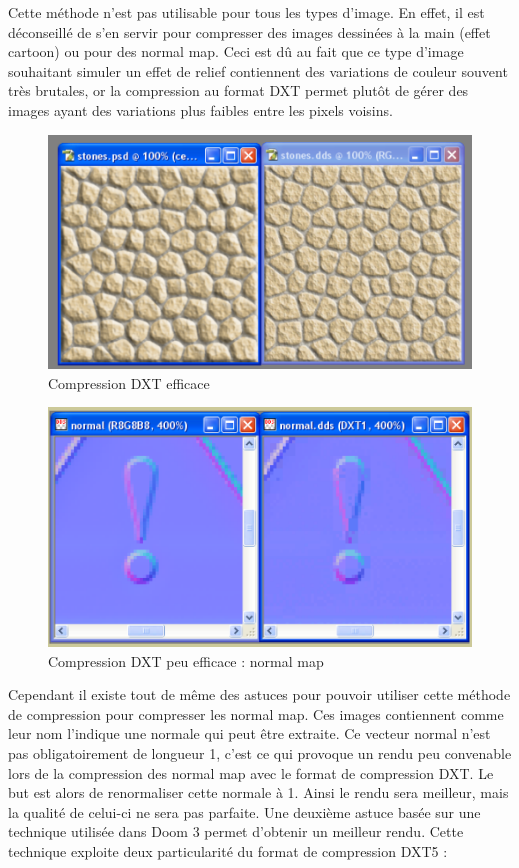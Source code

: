 \documentclass[a4paper, 11pt]{article} %
\begin{document}
Cette méthode n'est pas utilisable pour tous les types d'image. En effet, il est déconseillé de s'en servir pour compresser des images dessinées à la main (effet cartoon) ou pour des normal map. Ceci est dû au fait que ce type d'image souhaitant simuler un effet de relief contiennent des variations de couleur souvent très brutales, or la compression au format DXT permet plutôt de gérer des images ayant des variations plus faibles entre les pixels voisins.


\begin{figure}[!h]%
	\begin{center}
	\includegraphics[width=0.60\columnwidth]{images/dxt_compression_1.png}%
	\caption{Compression DXT efficace}%
	\label{}%
	\end{center}
\end{figure}

\begin{figure}[!h]%
	\begin{center}
	\includegraphics[width=0.60\columnwidth]{images/dxt_compression_2.png}%
	\caption{Compression DXT peu efficace : normal map}%
	\label{}%
	\end{center}
\end{figure}

Cependant il existe tout de même des astuces pour pouvoir utiliser cette méthode de compression pour compresser les normal map. Ces images contiennent comme leur nom l'indique une normale qui peut être extraite. Ce vecteur normal n'est pas obligatoirement de longueur 1, c'est ce qui provoque un rendu peu convenable lors de la compression des normal map avec le format de compression DXT. Le but est alors de renormaliser cette normale à 1. Ainsi le rendu sera meilleur, mais la qualité de celui-ci ne sera pas parfaite. Une deuxième astuce basée sur une technique utilisée dans Doom 3 permet d'obtenir un meilleur rendu. Cette technique exploite deux particularité du format de compression DXT5 :
\end{document}
